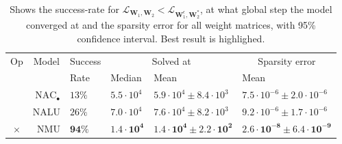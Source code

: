 \begin{table}[!h]

\caption{\label{tab:very-simple-function-results}Shows the success-rate for $\mathcal{L}_{\mathbf{W}_1, \mathbf{W}_2} < \mathcal{L}_{\mathbf{W}_1^\epsilon, \mathbf{W}_2^*}$, at what global step the model converged at and the sparsity error for all weight matrices, with 95\% confidence interval. Best result is highlighed.}
\centering
\begin{tabular}{crllll}
\toprule
\multicolumn{1}{c}{Op} & \multicolumn{1}{c}{Model} & \multicolumn{1}{c}{Success} & \multicolumn{2}{c}{Solved at} & \multicolumn{1}{c}{Sparsity error} \\
\cmidrule(l{3pt}r{3pt}){1-1} \cmidrule(l{3pt}r{3pt}){2-2} \cmidrule(l{3pt}r{3pt}){3-3} \cmidrule(l{3pt}r{3pt}){4-5} \cmidrule(l{3pt}r{3pt}){6-6}
 &  & Rate & Median & Mean & Mean\\
\midrule
 & $\mathrm{NAC}_{\bullet}$ & $13\%$ & $5.5 \cdot 10^{4}$ & $5.9 \cdot 10^{4} \pm 8.4 \cdot 10^{3}$ & $7.5 \cdot 10^{-6} \pm 2.0 \cdot 10^{-6}$\\

 & NALU & $26\%$ & $7.0 \cdot 10^{4}$ & $7.6 \cdot 10^{4} \pm 8.2 \cdot 10^{3}$ & $9.2 \cdot 10^{-6} \pm 1.7 \cdot 10^{-6}$\\

\multirow{-3}{*}{\centering\arraybackslash $\bm{\times}$} & NMU & $\mathbf{94\%}$ & $\mathbf{1.4 \cdot 10^{4}}$ & $\mathbf{1.4 \cdot 10^{4} \pm 2.2 \cdot 10^{2}}$ & $\mathbf{2.6 \cdot 10^{-8} \pm 6.4 \cdot 10^{-9}}$\\
\bottomrule
\end{tabular}
\end{table}
